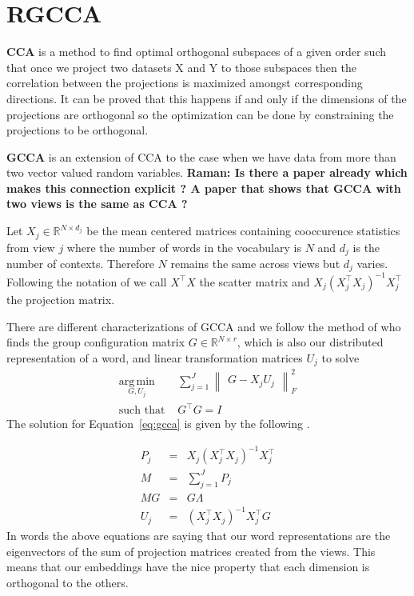 \documentclass[11pt]{article}
\begin{document}
\section{RGCCA}
\label{sec:gcca}
\textbf{CCA} is a method to find optimal orthogonal subspaces of a given order such that once we
project two datasets X and Y to those subspaces then the correlation
between the projections is maximized amongst corresponding
directions. It can be proved that this happens if and only if the
dimensions of the projections are orthogonal so the optimization can
be done by constraining the projections to be orthogonal.

\textbf{GCCA} \cite{kettenring1971canonical,carroll1968generalization} is an
extension of CCA to the case when we have data from more than two
vector valued random variables. \textbf{Raman: Is there a paper
  already which makes this connection explicit ? A paper that shows
  that GCCA with two views is the same as CCA ?}

Let $X_j \in \mathbb{R}^{N\times d_j}$ be the mean centered matrices
containing cooccurence statistics from view 
$j$ where the number of words in the vocabulary is $N$ and $d_j$ is
the number of contexts. Therefore $N$ remains the same across views
but  $d_j$ varies. Following the notation of \cite{hastie2009elements} we call $X^\top X$
the scatter matrix and $X_j (X_j^\top X_j)^{-1}X_j^\top$ the
projection matrix.

There are different characterizations of GCCA and we follow the method
of \cite{carroll1968generalization} who finds the
 group configuration matrix $G \in \mathbb{R}^{N\times r}$, which is
 also our distributed representation of a word, and linear transformation matrices
 $U_j$ to solve 
\begin{equation}
  \label{eq:gcca}
\begin{split}
  \operatorname*{arg\,min}_{G,U_j} & \sum_{j=1}^J \begin{Vmatrix} G - X_jU_j \end{Vmatrix}^2_F \\
  \text{such that } & G^\top G = I
\end{split}
\end{equation}
The solution for Equation~\ref{eq:gcca} is given by the following \cite{carroll1968generalization}.

\begin{eqnarray}
P_j &=& X_j(X_j^\top X_j)^{-1}X_j^\top \\
M &=& \sum_{j=1}^J P_j\\
M G &=& G \Lambda\\
U_j &=& \left(X_j^\top X_j\right)^{-1} X_j^\top G
\end{eqnarray}
In words the above
equations are saying that our word representations are the
eigenvectors of the sum of projection matrices created from the
views. This means that our embeddings have the nice property that each
dimension is orthogonal to the others.
\end{document}
